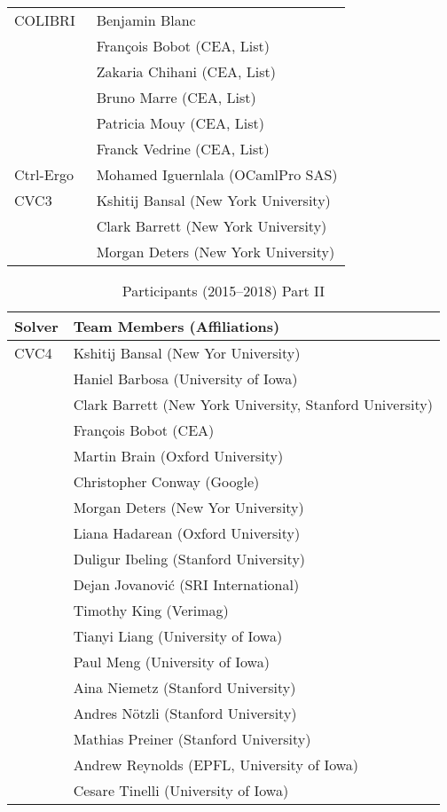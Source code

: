 {\begin{table}
{\begin{tabular}{ll}
      COLIBRI~\cite{colibri}
      & Benjamin Blanc \\
      & Fran\c{c}ois Bobot (CEA, List) \\
      & Zakaria Chihani (CEA, List) \\
      & Bruno Marre (CEA, List) \\
      & Patricia Mouy (CEA, List) \\
      & Franck Vedrine (CEA, List)
      \\ \midrule

      Ctrl-Ergo~\cite{10.1007/978-3-642-31365-3_8}
      & Mohamed Iguernlala (OCamlPro SAS)
      \\ \midrule

      CVC3~\cite{DBLP:conf/cav/BarrettT07}
      & Kshitij Bansal (New York University) \\
      & Clark Barrett (New York University) \\
      & Morgan Deters (New York University)
      \\ \bottomrule
    \end{tabular}
    }
  \end{table}


  \begin{table}
    \centering
    \caption{Participants (2015--2018) Part II}
    \label{table:participants2}
    \begin{tabular}{ll}
      \toprule
      Solver & Team Members (Affiliations)\\
      \midrule \midrule
      CVC4~\cite{DBLP:conf/cav/BarrettCDHJKRT11}
      & Kshitij Bansal (New Yor University) \\
      & Haniel Barbosa (University of Iowa) \\
      & Clark Barrett (New York University, Stanford University) \\
      & Fran\c{c}ois Bobot (CEA) \\
      & Martin Brain (Oxford University) \\
      & Christopher Conway (Google) \\
      & Morgan Deters (New Yor University) \\
      & Liana Hadarean (Oxford University) \\
      & Duligur Ibeling (Stanford University) \\
      & Dejan Jovanovi\'c (SRI International) \\
      & Timothy King (Verimag) \\
      & Tianyi Liang (University of Iowa) \\
      & Paul Meng (University of Iowa) \\
      & Aina Niemetz (Stanford University) \\
      & Andres N\"otzli (Stanford University) \\
      & Mathias Preiner (Stanford University) \\
      & Andrew Reynolds (EPFL, University of Iowa) \\
      & Cesare Tinelli (University of Iowa)
      \\ \midrule


\end{tabular}
\end{table}}
